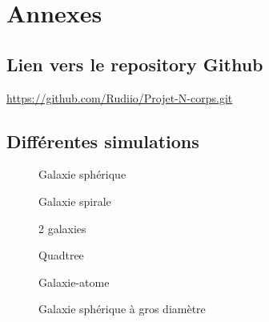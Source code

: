 \chapter*{Annexes}

\makeatletter
\renewcommand{\thesection}{\@arabic\c@section}
\makeatother

\appendix
\section{Lien vers le repository Github}
\url{https://github.com/Rudiio/Projet-N-corps.git}

\section{Différentes simulations}

\begin{figure}[H]
\begin{minipage}[b]{.46\linewidth}
\centering{}
\caption{Galaxie sphérique
    \label{fig16}
    }
\end{minipage} \hfill
\begin{minipage}[b]{.46\linewidth}
\centering{}
\caption{Galaxie spirale\label{fig17}}
\end{minipage}
\end{figure}

\begin{figure}[H]
\begin{minipage}[b]{.46\linewidth}
\centering{}
\caption{2 galaxies\label{fig18}}
\end{minipage} \hfill
\begin{minipage}[b]{.46\linewidth}
\centering{}
\caption{Quadtree\label{fig19}}
\end{minipage}
\end{figure}

\begin{figure}[H]
\begin{minipage}[b]{.46\linewidth}
\centering{}
\caption{Galaxie-atome\label{fig20}}
\end{minipage} \hfill
\begin{minipage}[b]{.46\linewidth}
\centering{}
\caption{Galaxie sphérique à gros diamètre\label{fig21}}
\end{minipage}
\end{figure}
